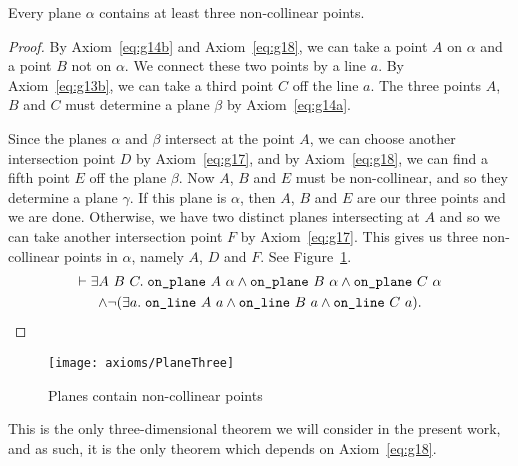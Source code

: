 \label{sec:PlaneThree}
\begin{proposition}\label{eq:PlaneThree}
Every plane $\alpha$ contains at least three non-collinear points.
\end{proposition}
\begin{proof}
By Axiom~\ref{eq:g14b} and Axiom~\ref{eq:g18}, we can take a point $A$ on $\alpha$ and a point $B$ not on $\alpha$. We connect these two points by a line $a$. By Axiom~\ref{eq:g13b}, we can take a third point $C$ off the line $a$. The three points $A$, $B$ and $C$ must determine a plane $\beta$ by Axiom~\ref{eq:g14a}.

Since the planes $\alpha$ and $\beta$ intersect at the point $A$, we can choose another intersection point $D$ by Axiom~\ref{eq:g17}, and by Axiom~\ref{eq:g18}, we can find a fifth point $E$ off the plane $\beta$. Now $A$, $B$ and $E$ must be non-collinear, and so they determine a plane $\gamma$. If this plane is $\alpha$, then $A$, $B$ and $E$ are our three points and we are done. Otherwise, we have two distinct planes intersecting at $A$ and so we can take another intersection point $F$ by Axiom~\ref{eq:g17}. This gives us three non-collinear points in $\alpha$, namely $A$, $D$ and $F$. See Figure~\ref{fig:PlaneThree}.
\begin{multline*}
\vdash\exists A\ B\ C.\; \texttt{on\_plane}\ A\ \alpha \wedge \texttt{on\_plane}\ B\ \alpha \wedge \texttt{on\_plane}\ C\ \alpha\\
\wedge\neg(\exists a.\; \texttt{on\_line}\ A\ a\wedge \texttt{on\_line}\ B\ a\wedge \texttt{on\_line}\ C\ a).
\end{multline*}
\end{proof}
\begin{figure}
\centering\texttt{[image: axioms/PlaneThree]}
\caption{Planes contain non-collinear points}
\label{fig:PlaneThree}
\end{figure}

This is the only three-dimensional theorem we will consider in the present work, and as such, it is the only theorem which depends on Axiom~\ref{eq:g18}.

